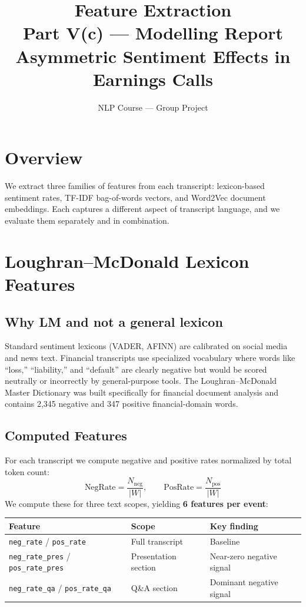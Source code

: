 \documentclass[12pt,a4paper]{article}
\title{\textbf{Feature Extraction}\\[0.3em]
\large Part V(c) --- Modelling Report\\
Asymmetric Sentiment Effects in Earnings Calls}
\author{NLP Course --- Group Project}
\date{}
\begin{document}
\maketitle

\section{Overview}

We extract three families of features from each transcript: lexicon-based sentiment
rates, TF-IDF bag-of-words vectors, and Word2Vec document embeddings.
Each captures a different aspect of transcript language, and we evaluate them
separately and in combination.

\section{Loughran--McDonald Lexicon Features}

\subsection{Why LM and not a general lexicon}

Standard sentiment lexicons (VADER, AFINN) are calibrated on social media and news
text.  Financial transcripts use specialized vocabulary where words like ``loss,''
``liability,'' and ``default'' are clearly negative but would be scored neutrally
or incorrectly by general-purpose tools.
The Loughran--McDonald Master Dictionary was built specifically for financial
document analysis and contains 2,345 negative and 347 positive financial-domain words.

\subsection{Computed Features}

For each transcript we compute negative and positive rates normalized by total
token count:
\[
  \text{NegRate} = \frac{N_{\text{neg}}}{|W|}, \qquad
  \text{PosRate} = \frac{N_{\text{pos}}}{|W|}
\]
We compute these for three text scopes, yielding \textbf{6 features per event}:

\begin{center}
\begin{tabular}{lll}
\toprule
Feature & Scope & Key finding \\
\midrule
\texttt{neg\_rate} / \texttt{pos\_rate} & Full transcript & Baseline \\
\texttt{neg\_rate\_pres} / \texttt{pos\_rate\_pres} & Presentation section & Near-zero negative signal \\
\texttt{neg\_rate\_qa} / \texttt{pos\_rate\_qa} & Q\&A section & Dominant negative signal \\
\bottomrule
\end{tabular}
\end{center}
\end{document}
